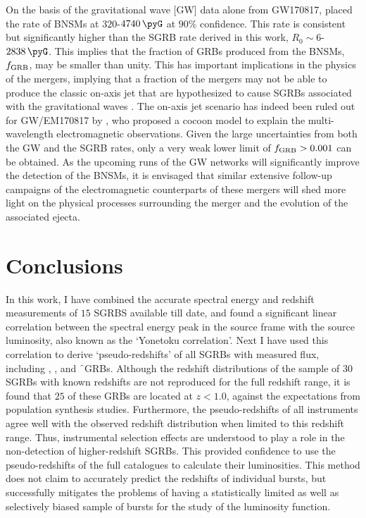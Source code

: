 On the basis of the gravitational wave [GW] data alone from GW170817, \cite{GW170817-2017} placed the rate of BNSMs at $320$-$4740 \, \pyG $ at $90\%$ confidence. This rate is consistent but significantly higher than the SGRB rate derived in this work, $R_0 \sim 6 $-$ 2838 \, \pyG $. This implies that the fraction of GRBs produced from the BNSMs, $f_{{\rm GRB}}$, may be smaller than unity. This has important implications in the physics of the mergers, implying that a fraction of the mergers may not be able to produce the classic on-axis jet that are hypothesized to cause SGRBs associated with the gravitational waves \citep{Narayan_et_al.-1992-ApJ}. The on-axis jet scenario has indeed been ruled out for GW/EM170817 by \cite{Kasliwal_et_al.-2017-Science}, who proposed a cocoon model to explain the multi-wavelength electromagnetic observations. Given the large uncertainties from both the GW and the SGRB rates, only a very weak lower limit of $f_{{\rm GRB}} > 0.001$ can be obtained. As the upcoming runs of the GW networks will significantly improve the detection of the BNSMs, it is envisaged that similar extensive follow-up campaigns of the electromagnetic counterparts of these mergers will shed more light on the physical processes surrounding the merger and the evolution of the associated ejecta.



\section{Conclusions}
\label{sec:conclusions--SGRBs}
In this work, I have combined the accurate spectral energy and redshift measurements of $15$ SGRBS available till date, and found a significant linear correlation between the spectral energy peak in the source frame with the source luminosity, also known as the `Yonetoku correlation'. Next I have used this correlation to derive `pseudo-redshifts' of all SGRBs with measured flux, including \B, \s, and \f\ GRBs. Although the redshift distributions of the sample of $30$ SGRBs with known redshifts are not reproduced for the full redshift range, it is found that $25$ of these GRBs are located at $z < 1.0$, against the expectations from population synthesis studies. Furthermore, the pseudo-redshifts of all instruments agree well with the observed redshift distribution when limited to this redshift range. Thus, instrumental selection effects are understood to play a role in the non-detection of higher-redshift SGRBs. This provided confidence to use the pseudo-redshifts of the full catalogues to calculate their luminosities. This method does not claim to accurately predict the redshifts of individual bursts, but successfully mitigates the problems of having a statistically limited as well as selectively biased sample of bursts for the study of the luminosity function.

